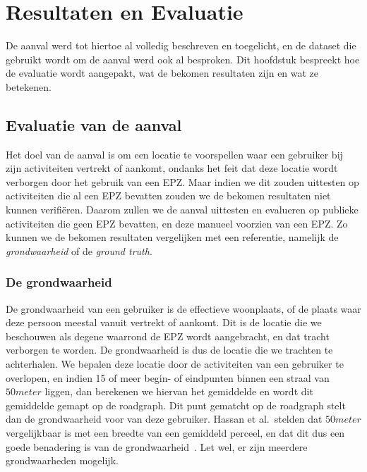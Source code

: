 \chapter{Resultaten en Evaluatie}
De aanval werd tot hiertoe al volledig beschreven en toegelicht, en de dataset
die gebruikt wordt om de aanval werd ook al besproken. Dit hoofdstuk bespreekt
hoe de evaluatie wordt aangepakt, wat de bekomen resultaten zijn en wat ze
betekenen.

\section{Evaluatie van de aanval}
Het doel van de aanval is om een locatie te voorspellen waar een gebruiker bij
zijn activiteiten vertrekt of aankomt, ondanks het feit dat deze locatie wordt
verborgen door het gebruik van een \ac{EPZ}. Maar indien we dit zouden
uittesten op activiteiten die al een \ac{EPZ} bevatten zouden we de bekomen
resultaten niet kunnen verifiëren. Daarom zullen we de aanval uittesten en
evalueren op publieke activiteiten die geen \ac{EPZ} bevatten, en deze manueel
voorzien van een \ac{EPZ}. Zo kunnen we de bekomen resultaten vergelijken met
een referentie, namelijk de \textit{grondwaarheid} of de \textit{ground truth}.

\subsection{De grondwaarheid}
De grondwaarheid van een gebruiker is de effectieve woonplaats, of de plaats
waar deze persoon meestal vanuit vertrekt of aankomt. Dit is de locatie die we
beschouwen als degene waarrond de \ac{EPZ} wordt aangebracht, en dat tracht
verborgen te worden. De grondwaarheid is dus de locatie die we trachten te
achterhalen. We bepalen deze locatie door de activiteiten van een gebruiker te
overlopen, en indien 15 of meer begin- of eindpunten binnen een straal van $50
    meter$ liggen, dan berekenen we hiervan het gemiddelde en wordt dit gemiddelde
gemapt op de roadgraph. Dit punt gematcht op de roadgraph stelt dan de
grondwaarheid voor van deze gebruiker. Hassan et al.\ stelden dat $50 meter$
vergelijkbaar is met een breedte van een gemiddeld perceel, en dat dit dus een
goede benadering is van de grondwaarheid~\cite{sec18has3:online,
    Verdonck_2022}. Let wel, er zijn meerdere grondwaarheden mogelijk.

